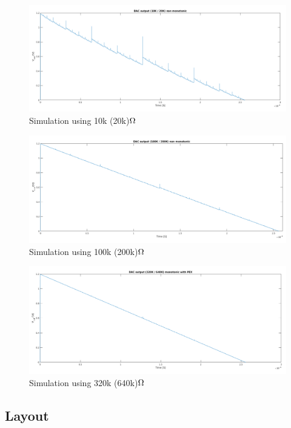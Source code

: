 \documentclass[english, 12pt, a4paper]{ifimaster}
\begin{document}
\begin{figure}[!ht]
 \centering
 \includegraphics[width=\textwidth]{img/non_monotonic/non_monotonic_10K}
 \caption{Simulation using 10k (20k)\(\ohm\)}
 \label{fig:sim:dac:10k}
\end{figure}
\begin{figure}[!ht]
 \centering
 \includegraphics[width=\textwidth]{img/non_monotonic/non_monotonic_100K}
 \caption{Simulation using 100k (200k)\(\ohm\)}
 \label{fig:sim:dac:100k}
\end{figure}
\begin{figure}[!ht]
 \centering
 \includegraphics[width=\textwidth]{img/non_monotonic/non_monotonic_320K}
 \caption{Simulation using 320k (640k)\(\ohm\)}
 \label{fig:sim:dac:320k}
\end{figure}


\subsection{Layout}
\end{document}

